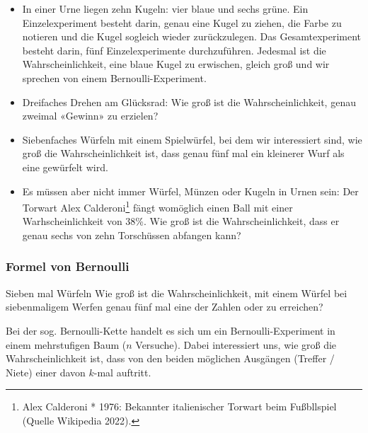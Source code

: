 \begin{itemize}
\item
In einer Urne liegen zehn Kugeln: vier blaue und sechs grüne. Ein
Einzelexperiment besteht darin, genau eine Kugel zu ziehen, die Farbe
zu notieren und die Kugel sogleich wieder zurückzulegen.
Das Gesamtexperiment besteht darin, fünf Einzelexperimente
durchzuführen. Jedesmal ist die Wahrscheinlichkeit, eine blaue Kugel
zu erwischen, gleich groß und wir sprechen von einem Bernoulli-Experiment.

\item Dreifaches Drehen am Glücksrad: Wie groß ist die Wahrscheinlichkeit, genau zweimal «Gewinn» zu erzielen?

\item Siebenfaches Würfeln mit einem Spielwürfel, bei dem wir
  interessiert sind, wie groß die Wahrscheinlichkeit ist, dass genau fünf mal ein kleinerer Wurf als eine  gewürfelt wird.
  
\item
Es müssen aber nicht immer Würfel, Münzen oder Kugeln in Urnen sein:
Der Torwart Alex Calderoni\footnote{Alex Calderoni * 1976: Bekannter
  italienischer Torwart beim Fußbllspiel (Quelle Wikipedia 2022).}
fängt womöglich einen Ball mit einer
Warhscheinlichkeit von 38\%.
Wie groß ist die Wahrscheinlichkeit, dass er genau sechs von zehn Torschüssen
abfangen kann?
\end{itemize}
\newpage


\subsubsection{Formel von Bernoulli}



\begin{beispiel}{Sieben mal Würfeln}{}
Wie groß ist die Wahrscheinlichkeit, mit einem Würfel bei
siebenmaligem Werfen genau fünf mal eine der Zahlen  oder
 zu erreichen?
\end{beispiel}

Bei der sog. Bernoulli-Kette handelt es sich um ein
Bernoulli-Experiment
in einem mehrstufigen Baum ($n$ Versuche). Dabei interessiert
uns, wie groß die Wahrscheinlichkeit ist, dass von den beiden
möglichen Ausgängen (Treffer / Niete) einer davon $k$-mal auftritt.

